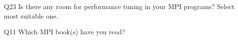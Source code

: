 \begin{description}%
\item{Q23} Is there any room for performance tuning in your MPI programs? Select most suitable one.%
\item{Q11} Which MPI book(s) have you read?%
\end{description}%
